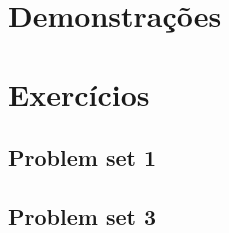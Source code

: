 \documentclass[12pt, a4paper]{article}
\begin{document}

\pagebreak
\tableofcontents
\pagebreak

\section{Demonstrações}



\pagebreak

\section{Exercícios}
\subsection{Problem set 1}

\pagebreak

\subsection{Problem set 3}

\end{document}
